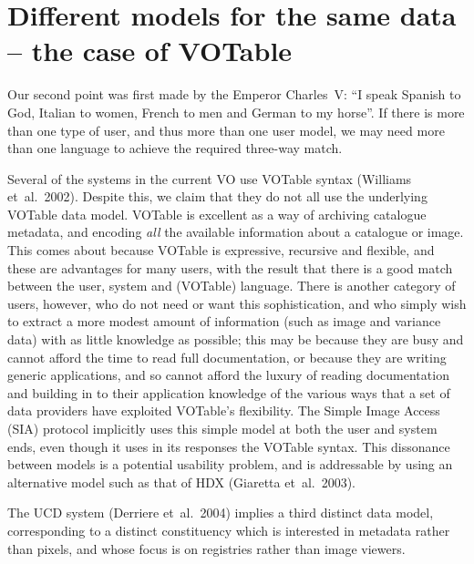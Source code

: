 \documentclass[11pt,twoside]{article}
\begin{document}
\section{Different models for the same data -- the case of VOTable}

Our second point was first made by the Emperor
Charles~V: ``I speak Spanish to God, Italian to women, French to men
and German to my horse''.
If there is more than one type of user, and thus more than one user
model, we may need more than one language to achieve the required three-way
match.

Several of the systems in the current VO use VOTable
syntax (Williams et~al.\ 2002).  Despite this, we claim that they do
not all use the underlying VOTable data model.
%
VOTable is excellent as a way of archiving catalogue metadata, and
encoding \emph{all} the available information about a catalogue or image.
This comes about because VOTable is
expressive, recursive and
flexible, and these are advantages for many users, with the result that
there is a good match between the user, system and (VOTable) language.
There is another category of users, however, who do not need or want this
sophistication, and who simply wish to extract a more modest amount of
information (such as image and variance data) with as little knowledge as
possible; this may be because they are busy and cannot afford the time to
read full documentation, or because they are writing generic applications,
and so cannot afford the luxury of reading documentation and building
in to their application knowledge of the various ways that a set of data
providers have exploited VOTable's flexibility.  The Simple Image Access
(SIA) protocol implicitly uses this simple model at both the user and
system ends, even though it uses in its responses the VOTable syntax.
This
dissonance between models is a potential usability problem, and is
addressable by using an alternative model such as that
of %
HDX (Giaretta et~al.\ 2003).

The UCD system (Derriere et~al.\ 2004) implies a third distinct data
model, corresponding to a distinct constituency which is interested in
metadata rather than pixels, and whose focus is on registries rather
than image viewers.
\end{document}
